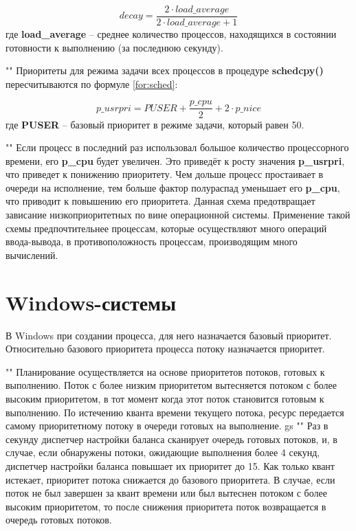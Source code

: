 \begin{equation}
    \label{for:bsd}
    decay = \frac{2 \cdot load\_average}{2 \cdot load\_average + 1}
\end{equation}
где \textbf{load\_average} -- среднее количество процессов, находящихся в состоянии готовности к выполнению (за последнюю секунду).

""\newline
\noindent Приоритеты для режима задачи всех процессов в процедуре \textbf{schedcpy()} пересчитываются по формуле \eqref{for:sched}:

\begin{equation}
    \label{for:sched}
    p\_usrpri = PUSER + \frac{p\_cpu}{2} + 2 \cdot p\_nice
\end{equation}
где \textbf{PUSER} -- базовый приоритет в режиме задачи, который равен 50.

""\newline 
\noindent Если процесс в последний раз использовал большое количество процессорного времени, его \textbf{p\_cpu} будет увеличен. Это приведёт к росту значения \textbf{p\_usrpri}, что приведет к понижению приоритету. Чем дольше процесс простаивает в очереди на исполнение, тем больше фактор полураспад уменьшает его \textbf{p\_cpu}, что приводит к повышению его приоритета. Данная схема предотвращает зависание низкоприоритетных по вине операционной системы. Применение такой схемы предпочтительнее процессам, которые осуществляют много операций ввода-вывода, в противоположность процессам, производящим много вычислений.

\section{Windows-системы}

\noindent В Windows при создании процесса, для него назначается базовый приоритет. Относительно базового приоритета процесса потоку назначается приоритет.

""\newline 
\noindent Планирование осуществляется на основе приоритетов потоков, готовых к выполнению. Поток с более низким приоритетом вытесняется потоком с более высоким приоритетом, в тот момент когда этот поток становится готовым к выполнению. По истечению кванта времени текущего потока, ресурс передается самому приоритетному потоку в очереди готовых на выполнение.
gs
""\newline
\noindent Раз в секунду диспетчер настройки баланса сканирует очередь готовых потоков, и, в случае, если обнаружены потоки, ожидающие выполнения более 4 секунд, диспетчер настройки баланса повышает их приоритет до 15. Как только квант истекает, приоритет потока снижается до базового приоритета. В случае, если поток не был завершен за квант времени или был вытеснен потоком с более высоким приоритетом, то после снижения приоритета поток возвращается в очередь готовых потоков.

